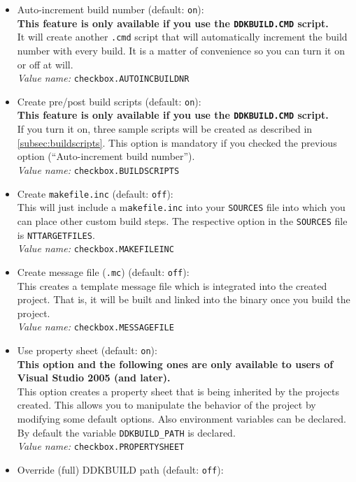 \documentclass[a4paper,titlepage]{report}
\newcommand{\important}[1]{\textcolor[rgb]{0.90,0.00,0.00}{\textbf{#1}}}
\newcommand{\default}[1]{\textcolor[gray]{0.40}{(default: \texttt{#1})}}
\newcommand{\option}[1]{\textcolor[rgb]{0.00,0.20,0.20}{\textsf{#1}}}
\newcommand{\optiondeco}[1]{#1\vspace{0.1cm}}
\newcommand{\inioption}[1]{\\\textcolor[rgb]{0.00,0.00,0.40}{\textsl{Value name:} \texttt{#1}}}
\begin{document}
\begin{itemize}
  between \texttt{WCHAR*} and \texttt{UNICODE\_STRING}, for example).
  \inioption{checkbox.STRICTERCPP}
  \item \optiondeco{\option{Auto-increment build number} \default{on}:}\\
  \important{This feature is only available if you use the \texttt{DDKBUILD.CMD} script.}\\
  It will create another \texttt{.cmd} script that will automatically
  increment the build number with every build. It is a matter of
  convenience so you can turn it on or off at will.
  \inioption{checkbox.AUTOINCBUILDNR}
  \item \optiondeco{\option{Create pre/post build scripts} \default{on}:}\\
  \important{This feature is only available if you use the \texttt{DDKBUILD.CMD} script.}\\
  If you turn it on, three sample scripts will be created as described in
  \autoref{subsec:buildscripts}. This option is mandatory if you
  checked the previous option (``Auto-increment build number'').
  \inioption{checkbox.BUILDSCRIPTS}
  \item \optiondeco{\option{Create \texttt{makefile.inc}} \default{off}:}\\
  This will just include a m\texttt{akefile.inc} into your \texttt{SOURCES} file into which
  you can place other custom build steps. The respective option in the
  \texttt{SOURCES} file is \texttt{NTTARGETFILES}.
  \inioption{checkbox.MAKEFILEINC}
  \item \optiondeco{\option{Create message file (\texttt{.mc})} \default{off}:}\\
  This creates a template message file which is integrated into the
  created project. That is, it will be built and linked into the
  binary once you build the project.
  \inioption{checkbox.MESSAGEFILE}
  \item \optiondeco{\option{Use property sheet} \default{on}:}\\
  \important{This option and the following ones are only available to users of
  Visual Studio 2005 (and later).}\\
  This option creates a property sheet that is being inherited by the projects
  created. This allows you to manipulate the behavior of the project by
  modifying some default options. Also environment variables can be declared.
  By default the variable \texttt{DDKBUILD\_PATH} is declared.
  \inioption{checkbox.PROPERTYSHEET}
  \item \optiondeco{\option{Override (full) DDKBUILD path} \default{off}:}\\

\end{itemize}
\end{document}
